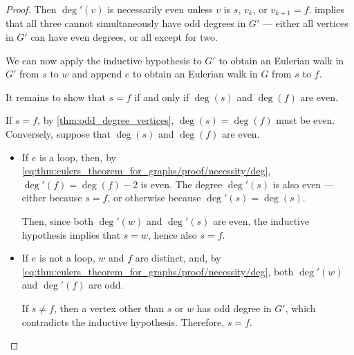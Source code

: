 \begin{proof}
  Then \( \deg'(v) \) is necessarily even unless \( v \) is \( s \), \( v_k \), or \( v_{k+1} = f \).  implies that all three cannot simultaneously have odd degrees in \( G' \) --- either all vertices in \( G' \) can have even degrees, or all except for two.

  We can now apply the inductive hypothesis to \( G' \) to obtain an Eulerian walk in \( G' \) from \( s \) to \( w \) and append \( e \) to obtain an Eulerian walk in \( G \) from \( s \) to \( f \).

  It remains to show that \( s = f \) if and only if \( \deg(s) \) and \( \deg(f) \) are even.

  If \( s = f \), by \cref{thm:odd_degree_vertices}, \( \deg(s) = \deg(f) \) must be even. Conversely, suppose that \( \deg(s) \) and \( \deg(f) \) are even.
  \begin{itemize}
    \item If \( e \) is a loop, then, by \eqref{eq:thm:eulers_theorem_for_graphs/proof/necessity/deg}, \( \deg'(f) = \deg(f) - 2 \) is even. The degree \( \deg'(s) \) is also even --- either because \( s = f \), or otherwise because \( \deg'(s) = \deg(s) \).

    Then, since both \( \deg'(w) \) and \( \deg'(s) \) are even, the inductive hypothesis implies that \( s = w \), hence also \( s = f \).

    \item If \( e \) is not a loop, \( w \) and \( f \) are distinct, and, by \eqref{eq:thm:eulers_theorem_for_graphs/proof/necessity/deg}, both \( \deg'(w) \) and \( \deg'(f) \) are odd.

    If \( s \neq f \), then a vertex other than \( s \) or \( w \) has odd degree in \( G' \), which contradicts the inductive hypothesis. Therefore, \( s = f \).
  \end{itemize}
\end{proof}
